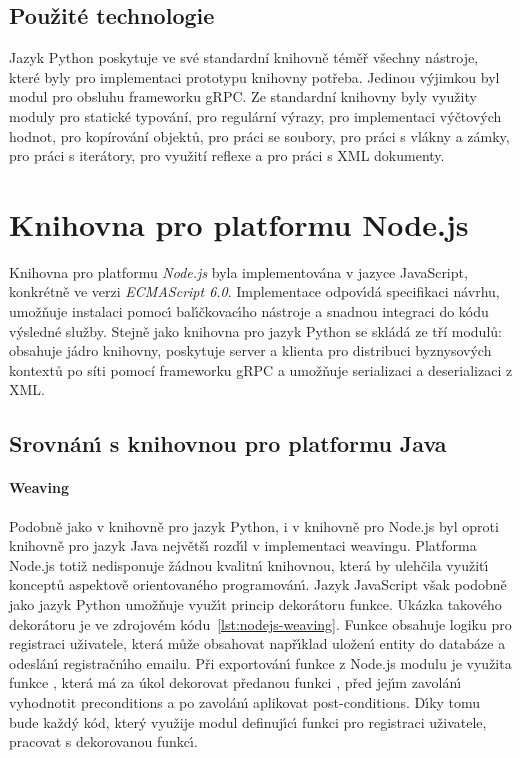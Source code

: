\subsection{Použité technologie}

Jazyk Python poskytuje ve své standardní knihovně téměř všechny nástroje, které byly pro implementaci
prototypu knihovny potřeba. Jedinou výjimkou byl modul pro obsluhu frameworku gRPC.
Ze standardní knihovny byly využity moduly  pro statické typování,
 pro regulární výrazy,  pro implementaci výčtových hodnot,  pro
kopírování objektů,  pro práci se soubory,  pro práci s vlákny a zámky,
 pro práci s iterátory,  pro využití reflexe
a  pro práci s XML dokumenty.


\section{Knihovna pro platformu Node.js}

Knihovna pro platformu \textit{Node.js} byla implementována
v jazyce JavaScript, konkrétně ve verzi \textit{ECMAScript 6.0}.
Implementace odpov\'{\i}dá specifikaci návrhu, umožňuje
instalaci pomoc\'{\i} bal\'{\i}čkovac\'{\i}ho nástroje a snadnou
integraci do kódu v\'ysledné služby. Stejně jako knihovna
pro jazyk Python se skládá ze tří modulů:  obsahuje
jádro knihovny,  poskytuje server a klienta pro distribuci
byznysových kontextů po síti pomocí frameworku gRPC a  umožňuje
serializaci a deserializaci z XML.

\subsection{Srovnán\'{\i} s knihovnou pro platformu Java}

\paragraph{Weaving} Podobně jako v knihovně pro jazyk Python,
i v knihovně pro Node.js byl oproti knihovně pro jazyk Java
největš\'{\i} rozd\'{\i}l v implementaci weavingu. Platforma Node.js
totiž nedisponuje žádnou kvalitn\'{\i} knihovnou, která by ulehčila
využit\'{\i} konceptů aspektově orientovaného programován\'{\i}.
Jazyk JavaScript však podobně jako jazyk Python umožňuje využ\'{\i}t
princip dekorátoru funkce. Ukázka takového dekorátoru je ve zdrojovém
kódu~\ref{lst:nodejs-weaving}. Funkce  obsahuje logiku pro registraci uživatele,
která může obsahovat např\'{\i}klad uložen\'{\i} entity do databáze a odeslán\'{\i}
registračn\'{\i}ho emailu. Při exportován\'{\i} funkce z Node.js modulu
je využita funkce , která má za úkol dekorovat
předanou funkci , před jej\'{\i}m zavolán\'{\i} vyhodnotit
preconditions a po zavolán\'{\i} aplikovat post-conditions.
D\'{\i}ky tomu bude každ\'y kód, kter\'y využije modul definuj\'{\i}c\'{\i} funkci
pro registraci uživatele, pracovat s dekorovanou funkc\'{\i}.

